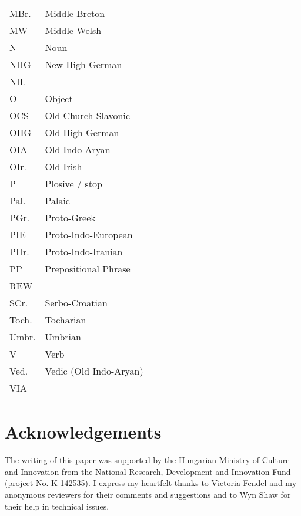 \documentclass[output=paper,colorlinks,citecolor=brown]{langscibook}
\begin{document}
\begin{tabularx}{.5\textwidth}{@{}lQ@{}}
MBr. & Middle Breton \\
MW & Middle Welsh \\
N & Noun \\
NHG & New High German \\
NIL & \citealt{NIL} \\
O & Object \\
OCS & Old Church Slavonic \\
OHG & Old High German \\
OIA & Old Indo-Aryan \\
OIr. & Old Irish \\
P & Plosive / stop \\
Pal.& Palaic \\
PGr.& Proto-Greek \\
PIE & Proto-Indo-European \\
PIIr. & Proto-Indo-Iranian \\
PP & Prepositional Phrase \\
REW & \citealt{MeyerLübke1935} \\
SCr. & Serbo-Croatian \\
Toch. & Tocharian \\
Umbr. & Umbrian \\
V & Verb \\
Ved. & Vedic (Old Indo-Aryan) \\
VIA & \citealt{Werba1997} \\
\end{tabularx}





\section*{Acknowledgements}
The writing of this paper was supported by the Hungarian Ministry of Culture and Innovation from the National Research, Development and Innovation Fund (project No. K 142535). I express my heartfelt thanks to Victoria Fendel and my anonymous reviewers for their comments and suggestions and to Wyn Shaw for their help in technical issues.




\sloppy
\printbibliography[heading=subbibliography,notkeyword=this]
\end{document}
